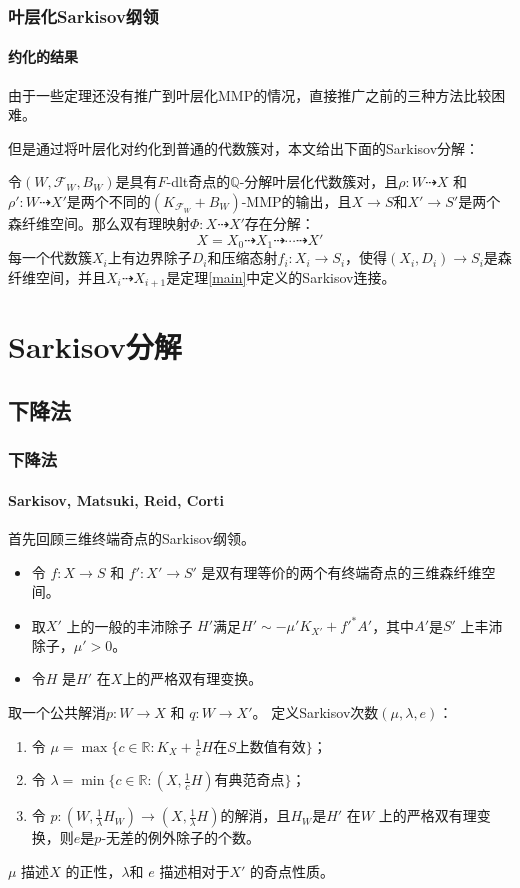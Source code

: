 \documentclass[10pt]{ctexbeamer}
\begin{document}
\begin{frame}[shrink]
  \frametitle{叶层化Sarkisov纲领}
  \framesubtitle{约化的结果}
  由于一些定理还没有推广到叶层化MMP的情况，直接推广之前的三种方法比较困难。

    \pause
但是通过将叶层化对约化到普通的代数簇对，本文给出下面的Sarkisov分解：
\begin{theorem}[王延泽]\label{main3}
  令$(W,\mathcal{F}_{W},B_{W})$是具有$F$-dlt奇点的$\mathbb{Q}$-分解叶层化代数簇对，且$\rho:W\dashrightarrow X$ 和$\rho':W \dashrightarrow X'$是两个不同的$(K_{\mathcal{F}_{W}}+B_{W})$-MMP的输出，且$X \to S$和$X' \to S'$是两个森纤维空间。那么双有理映射$\Phi:X \dashrightarrow X'$存在分解：
  \[ X=X_{0}\dashrightarrow X_{1}\dashrightarrow \cdots \dashrightarrow X' \]
  每一个代数簇$X_{i}$上有边界除子$D_{i}$和压缩态射$f_{i}:X_{i}\to S_{i}$，使得$(X_{i},D_{i})\to S_{i}$是森纤维空间，并且$X_{i} \dashrightarrow X_{i+1}$是定理\ref{main}中定义的Sarkisov连接。
\end{theorem}
\end{frame}



\section{Sarkisov分解}
\subsection{下降法}

\begin{frame}[shrink]
  \frametitle{下降法}
  \framesubtitle{Sarkisov, Matsuki, Reid, Corti}
首先回顾三维终端奇点的Sarkisov纲领。
\begin{itemize}
    \pause
  \item 
令 $f: X\to S$ 和 $f':X'\to S'$ 是双有理等价的两个有终端奇点的三维森纤维空间。
    \pause
  \item 
取$X'$ 上的一般的丰沛除子 $H'$满足$H'\sim -\mu'K_{X'}+f'^*A'$，其中$A'$是$S'$ 上丰沛除子，$\mu'>0$。
    \pause
  \item 
    令$H$ 是$H'$ 在$X$上的严格双有理变换。  
\end{itemize}

    \pause
取一个公共解消$p: W\to X$ 和 $q:W \to X'$。 定义Sarkisov次数$(\mu,\lambda,e)$：
\begin{enumerate}
  \item 令 $\mu= \max \{c \in \mathbb{R} : K_{X}+\frac{1}{c}H \text{在} S \text{上数值有效} \}$；
  \item 令 $\lambda = \min \{c\in \mathbb{R}: (X,\frac{1}{c}H) \text{有典范奇点}  \}$；
  \item 令 $p:(W, \frac{1}{\lambda} H_{W})\to (X,\frac{1}{\lambda}H)$的解消，且$H_{W}$是$H'$ 在$W$ 上的严格双有理变换，则$e$是$p$-无差的例外除子的个数。
\end{enumerate}
    \pause
   
\alert{$\mu$ 描述$X$ 的正性，$\lambda$和 $e$ 描述相对于$X'$ 的奇点性质。}
\end{frame}
\end{document}
